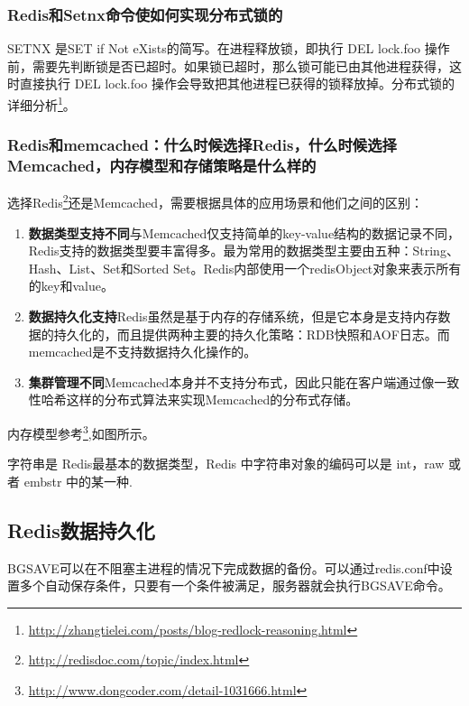 \documentclass[../../../interview-questions.tex]{subfiles}
\begin{document}
\subsubsection{Redis和Setnx命令使如何实现分布式锁的}

SETNX 是SET if Not eXists的简写。在进程释放锁，即执行 DEL lock.foo 操作前，需要先判断锁是否已超时。如果锁已超时，那么锁可能已由其他进程获得，这时直接执行 DEL lock.foo 操作会导致把其他进程已获得的锁释放掉。分布式锁的详细分析\footnote{\url{http://zhangtielei.com/posts/blog-redlock-reasoning.html}}。


\subsubsection{Redis和memcached：什么时候选择Redis，什么时候选择Memcached，内存模型和存储策略是什么样的}

选择Redis\footnote{\url{http://redisdoc.com/topic/index.html}}还是Memcached，需要根据具体的应用场景和他们之间的区别：

\begin{enumerate}
\item {\textbf{数据类型支持不同}}与Memcached仅支持简单的key-value结构的数据记录不同，Redis支持的数据类型要丰富得多。最为常用的数据类型主要由五种：String、Hash、List、Set和Sorted Set。Redis内部使用一个redisObject对象来表示所有的key和value。
\item {\textbf{数据持久化支持}}Redis虽然是基于内存的存储系统，但是它本身是支持内存数据的持久化的，而且提供两种主要的持久化策略：RDB快照和AOF日志。而memcached是不支持数据持久化操作的。
\item {\textbf{集群管理不同}}Memcached本身并不支持分布式，因此只能在客户端通过像一致性哈希这样的分布式算法来实现Memcached的分布式存储。
\end{enumerate}                                  

内存模型参考\footnote{\url{http://www.dongcoder.com/detail-1031666.html}},如图所示。



字符串是 Redis最基本的数据类型，Redis 中字符串对象的编码可以是 int，raw 或者 embstr 中的某一种.

\subsection{Redis数据持久化}

BGSAVE可以在不阻塞主进程的情况下完成数据的备份。可以通过redis.conf中设置多个自动保存条件，只要有一个条件被满足，服务器就会执行BGSAVE命令。
\end{document}
